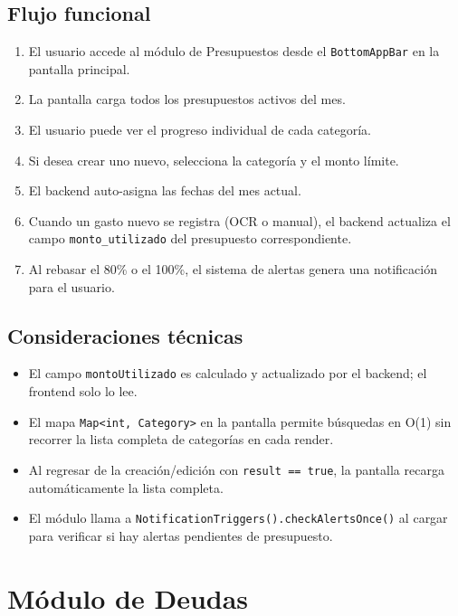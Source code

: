 \documentclass[12pt, letterpaper]{article}
\newcommand{\campo}[1]{\texttt{#1}}
\begin{document}
\subsection{Flujo funcional}

\begin{enumerate}
  \item El usuario accede al módulo de Presupuestos desde el
        \campo{BottomAppBar} en la pantalla principal.
  \item La pantalla carga todos los presupuestos activos del mes.
  \item El usuario puede ver el progreso individual de cada categoría.
  \item Si desea crear uno nuevo, selecciona la categoría y el monto límite.
  \item El backend auto-asigna las fechas del mes actual.
  \item Cuando un gasto nuevo se registra (OCR o manual), el backend
        actualiza el campo \campo{monto\_utilizado} del presupuesto
        correspondiente.
  \item Al rebasar el 80\% o el 100\%, el sistema de alertas genera una
        notificación para el usuario.
\end{enumerate}

\subsection{Consideraciones técnicas}

\begin{itemize}
  \item El campo \campo{montoUtilizado} es calculado y actualizado por el
        backend; el frontend solo lo lee.
  \item El mapa \campo{Map<int, Category>} en la pantalla permite búsquedas
        en O(1) sin recorrer la lista completa de categorías en cada render.
  \item Al regresar de la creación/edición con \campo{result == true},
        la pantalla recarga automáticamente la lista completa.
  \item El módulo llama a \campo{NotificationTriggers().checkAlertsOnce()}
        al cargar para verificar si hay alertas pendientes de presupuesto.
\end{itemize}


\section{Módulo de Deudas}
\end{document}

